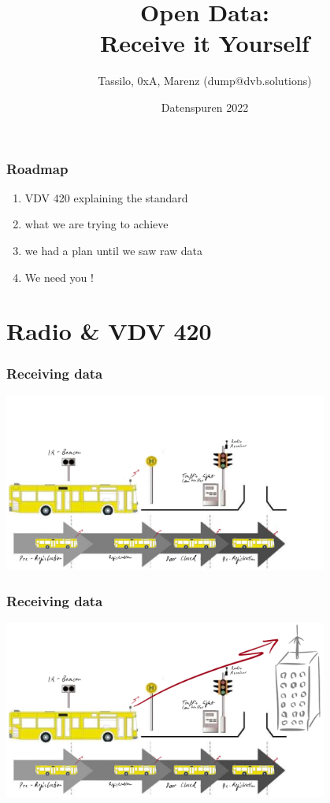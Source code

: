 \documentclass[aspectratio=169]{beamer}
\title{Open Data: \\ Receive it Yourself}
\date[ISPN ’80]{Datenspuren 2022}
\author[]{Tassilo, 0xA, Marenz (dump@dvb.solutions)}
\begin{document}
\begin{frame}\titlepage
\end{frame}
  
\begin{frame} 
\frametitle{Roadmap} 

\begin{enumerate}
    \item VDV 420 explaining the standard
    \item what we are trying to achieve
    \item we had a plan until we saw raw data
    \item We need you !
\end{enumerate}

\end{frame}

\section{Radio \& VDV 420}

\begin{frame}
\frametitle{Receiving data}
\centering
\includegraphics[width=0.8\textwidth]{figs/lsa-beeinflussungs-stecke.pdf}
\end{frame}

\begin{frame}
\frametitle{Receiving data}
\centering
\includegraphics[width=0.8\textwidth]{figs/lsa-beeinflussungs-stecke-mit-antenne.pdf}
\end{frame}
\end{document}
